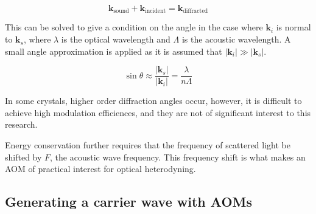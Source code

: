 \begin{equation}
\mathbf{k}_{\mathrm{sound}} + \mathbf{k}_{\mathrm{incident}} = \mathbf{k}_{\mathrm{diffracted}}
\end{equation}

This can be solved to give a condition on the angle in the case where $\mathbf{k}_i$ is normal to $\mathbf{k}_s$, where $\lambda$ is the optical wavelength and $\Lambda$ is the acoustic wavelength. A small angle approximation is applied as it is assumed that $|\mathbf{k}_i| \gg |\mathbf{k}_s|$.

\begin{equation} 
\sin{\theta} \approx \frac{|\mathbf{k}_s|}{|\mathbf{k}_i|} = \frac{\lambda}{n\Lambda}
\end{equation}

In some crystals, higher order diffraction angles occur, however, it is difficult to achieve high modulation efficiences, and they are not of significant interest to this research.






Energy conservation further requires that the frequency of scattered light be shifted by $F$, the acoustic wave frequency. \cite{haus} This frequency shift is what makes an AOM of practical interest for optical heterodyning.

\subsection{Generating a carrier wave with AOMs}
\label{sec:aom_carrier}

